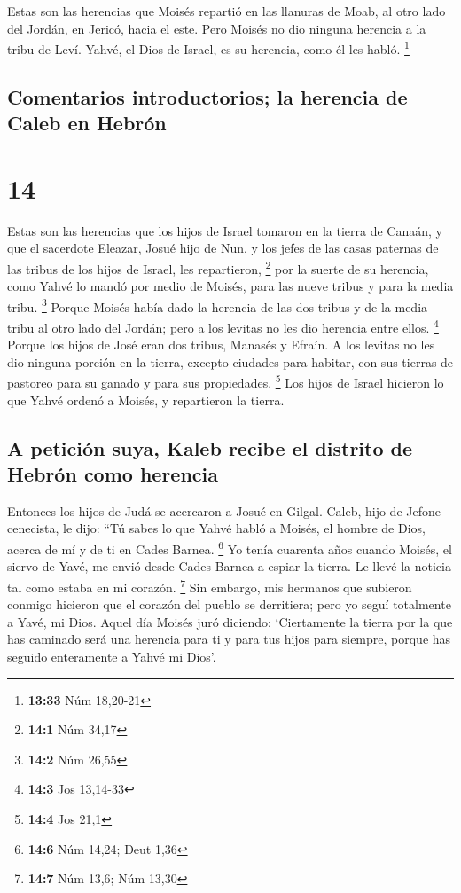  Estas son las herencias que Moisés repartió en las
llanuras de Moab, al otro lado del Jordán, en Jericó, hacia el este.
 Pero Moisés no dio ninguna herencia a la tribu de Leví.
Yahvé, el Dios de Israel, es su herencia, como él les habló. \footnote{\textbf{13:33}
  Núm 18,20-21}

\hypertarget{comentarios-introductorios-la-herencia-de-caleb-en-hebruxf3n}{%
\subsection{Comentarios introductorios; la herencia de Caleb en
Hebrón}\label{comentarios-introductorios-la-herencia-de-caleb-en-hebruxf3n}}

\hypertarget{section-13}{%
\section{14}\label{section-13}}

 Estas son las herencias que los hijos de Israel tomaron
en la tierra de Canaán, y que el sacerdote Eleazar, Josué hijo de Nun, y
los jefes de las casas paternas de las tribus de los hijos de Israel,
les repartieron, \footnote{\textbf{14:1} Núm 34,17}  por
la suerte de su herencia, como Yahvé lo mandó por medio de Moisés, para
las nueve tribus y para la media tribu. \footnote{\textbf{14:2} Núm
  26,55}  Porque Moisés había dado la herencia de las dos
tribus y de la media tribu al otro lado del Jordán; pero a los levitas
no les dio herencia entre ellos. \footnote{\textbf{14:3} Jos 13,14-33}
 Porque los hijos de José eran dos tribus, Manasés y
Efraín. A los levitas no les dio ninguna porción en la tierra, excepto
ciudades para habitar, con sus tierras de pastoreo para su ganado y para
sus propiedades. \footnote{\textbf{14:4} Jos 21,1}  Los
hijos de Israel hicieron lo que Yahvé ordenó a Moisés, y repartieron la
tierra.

\hypertarget{a-peticiuxf3n-suya-kaleb-recibe-el-distrito-de-hebruxf3n-como-herencia}{%
\subsection{A petición suya, Kaleb recibe el distrito de Hebrón como
herencia}\label{a-peticiuxf3n-suya-kaleb-recibe-el-distrito-de-hebruxf3n-como-herencia}}

 Entonces los hijos de Judá se acercaron a Josué en
Gilgal. Caleb, hijo de Jefone cenecista, le dijo: ``Tú sabes lo que
Yahvé habló a Moisés, el hombre de Dios, acerca de mí y de ti en Cades
Barnea. \footnote{\textbf{14:6} Núm 14,24; Deut 1,36}  Yo
tenía cuarenta años cuando Moisés, el siervo de Yavé, me envió desde
Cades Barnea a espiar la tierra. Le llevé la noticia tal como estaba en
mi corazón. \footnote{\textbf{14:7} Núm 13,6; Núm 13,30} 
Sin embargo, mis hermanos que subieron conmigo hicieron que el corazón
del pueblo se derritiera; pero yo seguí totalmente a Yavé, mi Dios.
 Aquel día Moisés juró diciendo: `Ciertamente la tierra
por la que has caminado será una herencia para ti y para tus hijos para
siempre, porque has seguido enteramente a Yahvé mi Dios'.

